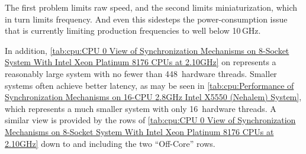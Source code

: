 {{	The first problem limits raw speed, and the second limits
	miniaturization, which in turn limits frequency.
	And even this sidesteps the power-consumption issue that
	is currently limiting production frequencies to well below
	10\,GHz.

	In addition,
	\cref{tab:cpu:CPU 0 View of Synchronization Mechanisms on 8-Socket System With Intel Xeon Platinum 8176 CPUs at 2.10GHz}
	on
	represents a reasonably large system with no fewer than 448~hardware
	threads.
	Smaller systems often achieve better latency, as may be seen in
	\cref{tab:cpu:Performance of Synchronization Mechanisms on 16-CPU 2.8GHz Intel X5550 (Nehalem) System},
	which represents a much smaller system with only 16~hardware threads.
	A similar view is provided by the rows of
	\cref{tab:cpu:CPU 0 View of Synchronization Mechanisms on 8-Socket System With Intel Xeon Platinum 8176 CPUs at 2.10GHz}
	down to and including the two ``Off-Core'' rows.

\begin{table}
\renewcommand*{\arraystretch}{1.1}
\centering\small
{}
\caption{CPU 0 View of Synchronization Mechanisms on 12-CPU Intel Core i7-8750H CPU @ 2.20\,GHz}
\label{tab:cpu:CPU 0 View of Synchronization Mechanisms on 12-CPU Intel Core i7-8750H CPU @ 2.20GHz}
\end{table}

}}
